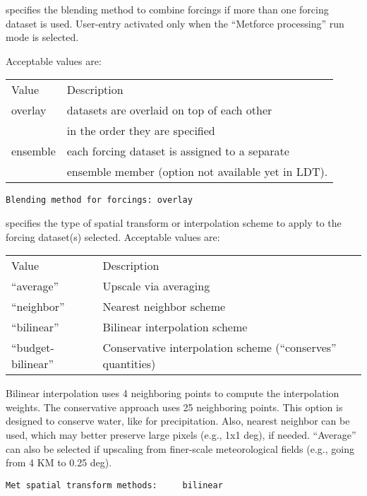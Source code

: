  
  specifies the
 blending method to combine forcings if more than one 
 forcing dataset is used. User-entry activated only when
 the ``Metforce processing'' run mode is selected.

 Acceptable values are:

 \begin{tabular}{ll}
 Value    & Description                                    \\
 overlay  & datasets are overlaid on top of each other     \\
          & in the order they are specified                \\
 ensemble & each forcing dataset is assigned to a separate \\
          & ensemble member (option not available yet in LDT). \\
 \end{tabular}
 

 \begin{Verbatim}[frame=single]
Blending method for forcings: overlay
 \end{Verbatim}

 
 specifies the type of spatial transform or interpolation
 scheme to apply to the forcing dataset(s) selected.
 Acceptable values are:

 \begin{tabular}{ll}
 Value & Description                                    \\
 ``average''           & Upscale via averaging          \\
 ``neighbor''          & Nearest neighbor scheme        \\
 ``bilinear''          & Bilinear interpolation scheme  \\
 ``budget-bilinear''   & Conservative interpolation scheme (``conserves'' quantities) \\
 \end{tabular}

 Bilinear interpolation uses 4 neighboring points to compute the
 interpolation weights. The conservative approach uses 25 neighboring
 points.  This option is designed to conserve water, like for
 precipitation.
 Also, nearest neighbor can be used, which may
 better preserve large pixels (e.g., 1x1 deg), if needed. ``Average''
 can also be selected if upscaling from finer-scale meteorological
 fields (e.g., going from 4 KM to 0.25 deg).
 

 \begin{Verbatim}[frame=single]
Met spatial transform methods:     bilinear
 \end{Verbatim}

